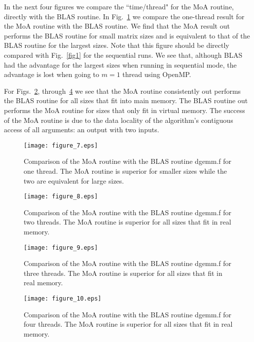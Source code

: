 \documentclass[aps,prl,twocolumn,groupedaddress,floatfix]{revtex4}
\begin{document}
In the next four figures we compare the ``time/thread" for the MoA routine,
directly with the BLAS routine.  In Fig.~\ref{fig6} we compare the one-thread
result for the MoA routine with the BLAS routine.  We find that the MoA
result out performs the BLAS routine for small matrix sizes and is equivalent
to that of the BLAS routine for the largest sizes.  Note that this figure
should be directly compared with Fig.~\ref{fig1} for the sequential 
runs.  We see that, although BLAS had the advantage for the largest sizes
when running in sequential mode, the advantage is lost when going to 
$m = 1$ thread using OpenMP.

For Figs.~\ref{fig7}, through~\ref{fig9} we see that the MoA routine 
consistently out performs the BLAS routine for all sizes that fit 
into main memory.  The BLAS routine out performs the MoA routine for sizes
that only fit in virtual memory.  The success of the MoA routine is due to
the data locality of the algorithm's contiguous 
access of all arguments: an output with two inputs.

\begin{figure} 
\texttt{[image: figure\_7.eps]}\caption{\label{fig6} Comparison of the MoA routine with the BLAS routine
dgemm.f for one thread. The MoA routine is superior for smaller sizes
while the two are equivalent for large sizes.
}
\end{figure}

\begin{figure}
\texttt{[image: figure\_8.eps]}\caption{\label{fig7} Comparison of the MoA routine with the BLAS routine
dgemm.f for two threads. The MoA routine is superior for all sizes
that fit in real memory.
}
\end{figure}

\begin{figure} 
\texttt{[image: figure\_9.eps]}\caption{\label{fig8} Comparison of the MoA routine with the BLAS routine
dgemm.f for three threads. The MoA routine is superior for all sizes
that fit in real memory.
}
\end{figure}

\begin{figure} 
\texttt{[image: figure\_10.eps]}\caption{\label{fig9} Comparison of the MoA routine with the BLAS routine
dgemm.f for four threads. The MoA routine is superior for all sizes
that fit in real memory.
}
\end{figure}
\end{document}
